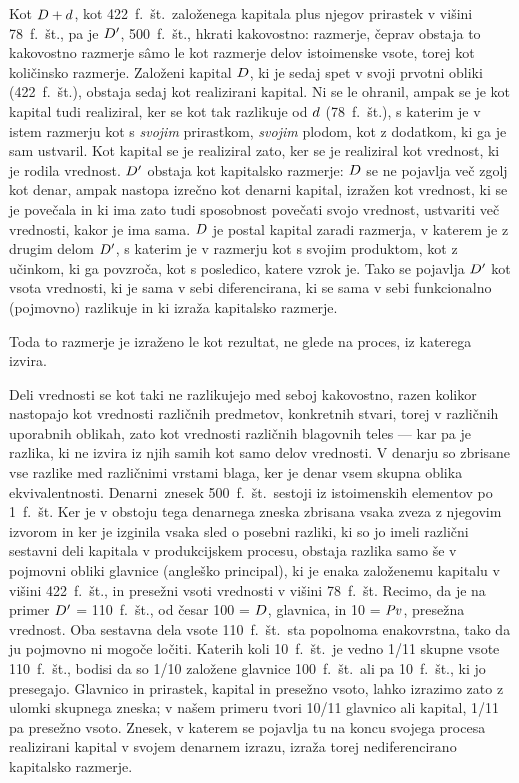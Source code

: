 \documentclass[kapital_02.tex]{subfiles}
\begin{document}
Kot \(D + d\), kot 422~f.~št.\ založenega kapitala plus njegov prirastek v višini 78~f.~št., pa je \(D'\), 500~f.~št., hkrati kakovostno: razmerje, čeprav obstaja to kakovostno razmerje s\^amo le kot razmerje delov istoimenske vsote, torej kot količinsko razmerje. Založeni kapital \(D\), ki je sedaj spet v svoji prvotni obliki (422~f.~št.), obstaja sedaj kot realizirani kapital. Ni se le ohranil, ampak se je kot kapital tudi realiziral, ker se kot tak razlikuje od \(d\) (78~f.~št.), s katerim je v istem razmerju kot s \emph{svojim} prirastkom, \emph{svojim} plodom, kot z dodatkom, ki ga je sam ustvaril. Kot kapital se je realiziral zato, ker se je realiziral kot vrednost, ki je rodila vrednost. \(D'\) obstaja kot kapitalsko razmerje: \(D\) se ne pojavlja več zgolj kot denar, ampak nastopa izrečno kot denarni kapital, izražen kot vrednost, ki se je povečala in ki ima zato tudi sposobnost povečati svojo vrednost, ustvariti več vrednosti, kakor je ima sama. \(D\) je postal kapital zaradi razmerja, v katerem je z drugim delom \(D'\), s katerim je v razmerju kot s svojim produktom, kot z učinkom, ki ga povzroča, kot s posledico, katere vzrok je. Tako se pojavlja \(D'\) kot vsota vrednosti, ki je sama v sebi diferencirana, ki se sama v sebi funkcionalno (pojmovno) razlikuje in ki izraža kapitalsko razmerje.

Toda to razmerje je izraženo le kot rezultat, ne glede na proces, iz katerega izvira.

Deli vrednosti se kot taki ne razlikujejo med seboj kakovostno, razen kolikor nastopajo kot vrednosti različnih predmetov, konkretnih stvari, torej v različnih uporabnih oblikah, zato kot vrednosti različnih blagovnih teles --- kar pa je razlika, ki ne izvira iz njih samih kot samo delov vrednosti. V denarju so zbrisane vse razlike med različnimi vrstami blaga, ker je denar vsem skupna oblika ekvivalentnosti. Denarni\KPEstran\ znesek 500~f.~št.\ sestoji iz istoimenskih elementov po 1~f.~št. Ker je v obstoju tega denarnega zneska zbrisana vsaka zveza z njegovim izvorom in ker je izginila vsaka sled o posebni razliki, ki so jo imeli različni sestavni deli kapitala v produkcijskem procesu, obstaja razlika samo še v pojmovni obliki glavnice (angleško principal), ki je enaka založenemu kapitalu v višini 422~f.~št., in presežni vsoti vrednosti v višini 78~f.~št. Recimo, da je na primer \(D'\) = 110~f.~št., od česar 100 = \(D\), glavnica, in 10 = \(\mathit{Pv}\), presežna vrednost. Oba sestavna dela vsote 110~f.~št.\ sta popolnoma enakovrstna, tako da ju pojmovno ni mogoče ločiti. Katerih koli 10~f.~št.\ je vedno 1/11 skupne vsote 110~f.~št., bodisi da so 1/10 založene glavnice 100~f.~št.\ ali pa 10~f.~št., ki jo presegajo. Glavnico in prirastek, kapital in presežno vsoto, lahko izrazimo zato z ulomki skupnega zneska; v našem primeru tvori 10/11 glavnico ali kapital, 1/11 pa presežno vsoto. Znesek, v katerem se pojavlja tu na koncu svojega procesa realizirani kapital v svojem denarnem izrazu, izraža torej nediferencirano kapitalsko razmerje.
\end{document}
